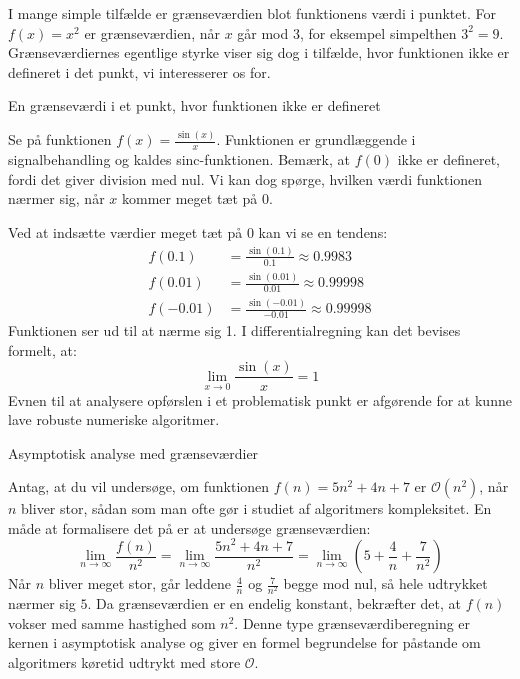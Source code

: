 I mange simple tilfælde er grænseværdien blot funktionens værdi i punktet. For \( f(x) = x^2 \) er grænseværdien, når \( x \) går mod 3, for eksempel simpelthen \( 3^2 = 9 \). Grænseværdiernes egentlige styrke viser sig dog i tilfælde, hvor funktionen ikke er defineret i det punkt, vi interesserer os for.

\begin{example} En grænseværdi i et punkt, hvor funktionen ikke er defineret

Se på funktionen \( f(x) = \frac{\sin(x)}{x} \). Funktionen er grundlæggende i signalbehandling og kaldes sinc-funktionen. Bemærk, at \( f(0) \) ikke er defineret, fordi det giver division med nul. Vi kan dog spørge, hvilken værdi funktionen nærmer sig, når \( x \) kommer meget tæt på 0.

Ved at indsætte værdier meget tæt på 0 kan vi se en tendens:
\begin{align*}
f(0.1) &= \frac{\sin(0.1)}{0.1} \approx 0.9983 \\
f(0.01) &= \frac{\sin(0.01)}{0.01} \approx 0.99998 \\
f(-0.01) &= \frac{\sin(-0.01)}{-0.01} \approx 0.99998
\end{align*}
Funktionen ser ud til at nærme sig 1. I differentialregning kan det bevises formelt, at:
\[
\lim_{x \to 0} \frac{\sin(x)}{x} = 1
\]
Evnen til at analysere opførslen i et problematisk punkt er afgørende for at kunne lave robuste numeriske algoritmer.
\end{example}

\begin{example} Asymptotisk analyse med grænseværdier

Antag, at du vil undersøge, om funktionen \( f(n) = 5n^2 + 4n + 7 \) er \( \mathcal{O}(n^2) \), når \( n \) bliver stor, sådan som man ofte gør i studiet af algoritmers kompleksitet. En måde at formalisere det på er at undersøge grænseværdien:
\[
\lim_{n \to \infty} \frac{f(n)}{n^2}
= \lim_{n \to \infty} \frac{5n^2 + 4n + 7}{n^2}
= \lim_{n \to \infty} \left( 5 + \frac{4}{n} + \frac{7}{n^2} \right)
\]
Når \( n \) bliver meget stor, går leddene \( \frac{4}{n} \) og \( \frac{7}{n^2} \) begge mod nul, så hele udtrykket nærmer sig \( 5 \). Da grænseværdien er en endelig konstant, bekræfter det, at \( f(n) \) vokser med samme hastighed som \( n^2 \). Denne type grænseværdiberegning er kernen i asymptotisk analyse og giver en formel begrundelse for påstande om algoritmers køretid udtrykt med store \(\mathcal{O}\).
\end{example}

